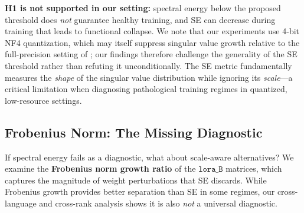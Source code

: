 \documentclass[11pt]{article}
\begin{document}
\textbf{H1 is not supported in our setting:} spectral energy below the proposed threshold does \emph{not} guarantee healthy training, and SE can decrease during training that leads to functional collapse. We note that our experiments use 4-bit NF4 quantization, which may itself suppress singular value growth relative to the full-precision setting of \citet{biderman2024lora}; our findings therefore challenge the generality of the SE threshold rather than refuting it unconditionally. The SE metric fundamentally measures the \emph{shape} of the singular value distribution while ignoring its \emph{scale}---a critical limitation when diagnosing pathological training regimes in quantized, low-resource settings.

\subsection{Frobenius Norm: The Missing Diagnostic}
\label{sec:frobenius}

If spectral energy fails as a diagnostic, what about scale-aware alternatives? We examine the \textbf{Frobenius norm growth ratio} of the $\texttt{lora\_B}$ matrices, which captures the magnitude of weight perturbations that SE discards. While Frobenius growth provides better separation than SE in some regimes, our cross-language and cross-rank analysis shows it is also \emph{not} a universal diagnostic.
\end{document}
